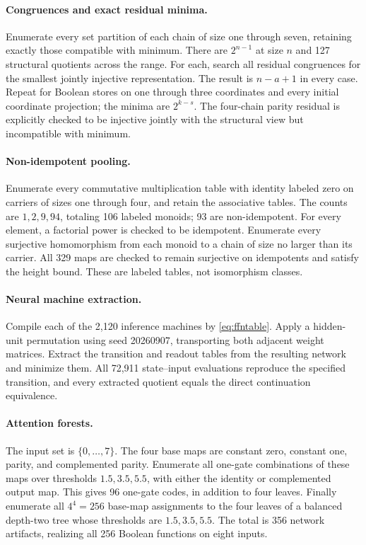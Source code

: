 \paragraph{Congruences and exact residual minima.}
Enumerate every set partition of each chain of size one through seven, retaining exactly those compatible with minimum. There are $2^{n-1}$ at size $n$ and 127 structural quotients across the range. For each, search all residual congruences for the smallest jointly injective representation. The result is $n-a+1$ in every case. Repeat for Boolean stores on one through three coordinates and every initial coordinate projection; the minima are $2^{k-s}$. The four-chain parity residual is explicitly checked to be injective jointly with the structural view but incompatible with minimum.

\paragraph{Non-idempotent pooling.}
Enumerate every commutative multiplication table with identity labeled zero on carriers of sizes one through four, and retain the associative tables. The counts are $1,2,9,94$, totaling 106 labeled monoids; 93 are non-idempotent. For every element, a factorial power is checked to be idempotent. Enumerate every surjective homomorphism from each monoid to a chain of size no larger than its carrier. All 329 maps are checked to remain surjective on idempotents and satisfy the height bound. These are labeled tables, not isomorphism classes.

\paragraph{Neural machine extraction.}
Compile each of the 2,120 inference machines by \eqref{eq:ffntable}. Apply a hidden-unit permutation using seed 20260907, transporting both adjacent weight matrices. Extract the transition and readout tables from the resulting network and minimize them. All 72,911 state--input evaluations reproduce the specified transition, and every extracted quotient equals the direct continuation equivalence.

\paragraph{Attention forests.}
The input set is $\{0,\ldots,7\}$. The four base maps are constant zero, constant one, parity, and complemented parity. Enumerate all one-gate combinations of these maps over thresholds $1.5,3.5,5.5$, with either the identity or complemented output map. This gives 96 one-gate codes, in addition to four leaves. Finally enumerate all $4^4=256$ base-map assignments to the four leaves of a balanced depth-two tree whose thresholds are $1.5,3.5,5.5$. The total is 356 network artifacts, realizing all 256 Boolean functions on eight inputs.

